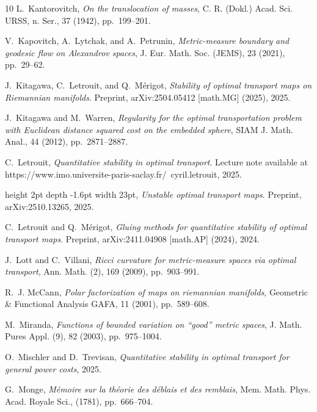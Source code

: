 \documentclass[a4paper,11pt]{article}
\numberwithin{equation}{section}
\theoremstyle{plain}
\theoremstyle{definition}
\theoremstyle{remark}
\begin{document}
\begin{thebibliography}{10}
{\sc L.~Kantorovitch}, {\em On the translocation of masses}, C. R. (Dokl.)
  Acad. Sci. URSS, n. Ser., 37 (1942), pp.~199--201.

{\sc V.~Kapovitch, A.~Lytchak, and A.~Petrunin}, {\em Metric-measure boundary
  and geodesic flow on {Alexandrov} spaces}, J. Eur. Math. Soc. (JEMS), 23
  (2021), pp.~29--62.

{\sc J.~Kitagawa, C.~Letrouit, and Q.~M{\'e}rigot}, {\em Stability of optimal
  transport maps on {Riemannian} manifolds}.
\newblock Preprint, {arXiv}:2504.05412 [math.{MG}] (2025), 2025.

{\sc J.~Kitagawa and M.~Warren}, {\em Regularity for the optimal transportation
  problem with {E}uclidean distance squared cost on the embedded sphere}, SIAM
  J. Math. Anal., 44 (2012), pp.~2871--2887.

{\sc C.~Letrouit}, {\em Quantitative stability in optimal transport}.
\newblock Lecture note available at
  https://www.imo.universite-paris-saclay.fr/~cyril.letrouit, 2025.

\leavevmode\vrule height 2pt depth -1.6pt width 23pt, {\em Unstable optimal
  transport maps}.
\newblock Preprint, arXiv:2510.13265, 2025.

{\sc C.~Letrouit and Q.~M{\'e}rigot}, {\em Gluing methods for quantitative
  stability of optimal transport maps}.
\newblock Preprint, {arXiv}:2411.04908 [math.{AP}] (2024), 2024.

{\sc J.~Lott and C.~Villani}, {\em Ricci curvature for metric-measure spaces
  via optimal transport}, Ann. Math. (2), 169 (2009), pp.~903--991.

{\sc R.~J. McCann}, {\em Polar factorization of maps on riemannian manifolds},
  Geometric \& Functional Analysis GAFA, 11 (2001), pp.~589--608.

{\sc M.~Miranda}, {\em Functions of bounded variation on ``good'' metric
  spaces}, J. Math. Pures Appl. (9), 82 (2003), pp.~975--1004.

{\sc O.~Mischler and D.~Trevisan}, {\em Quantitative stability in optimal
  transport for general power costs}, 2025.

{\sc G.~Monge}, {\em M{\'e}moire sur la th{\'e}orie des d{\'e}blais et des
  remblais}, Mem. Math. Phys. Acad. Royale Sci.,  (1781), pp.~666--704.


\end{thebibliography}
\end{document}

